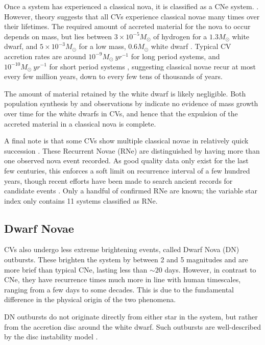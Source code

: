 Once a system has experienced a classical nova, it is classified as a CNe system. \citep{warner1995}. However, theory suggests that all CVs experience classical novae many times over their lifetimes. The required amount of accreted material for the nova to occur depends on mass, but lies between $3\times10^{-5} M_\odot$ of hydrogen for a $1.3 M_\odot$ white dwarf, and $5\times10^{-3} M_\odot$ for a low mass, $0.6 M_\odot$ white dwarf \citep{hellier2001}. Typical CV accretion rates are around $10^{-9} M_\odot\ yr^{-1}$ for long period systems, and $10^{-10} M_\odot\ yr^{-1}$ for short period systems \citep{hellier2001, Pala2021}, suggesting classical novae recur at most every few million years, down to every few tens of thousands of years.

The amount of material retained by the white dwarf is likely negligible. Both population synthesis by \citep{Wijnen2015} and observations by \citep{McAllister2017} indicate no evidence of mass growth over time for the white dwarfs in CVs, and hence that the expulsion of the accreted material in a classical nova is complete.

A final note is that some CVs show multiple classical novae in relatively quick succession \citep{schaeffer2010}. These Recurrent Novae (RNe) are distinguished by having more than one observed nova event recorded. As good quality data only exist for the last few centuries, this enforces a soft limit on recurrence interval of a few hundred years, though recent efforts have been made to search ancient records for candidate events \citep{hoffmann2022}. Only a handful of confirmed RNe are known; the variable star index \citep{Watson2006} only contains 11 systems classified as RNe.

\subsection{Dwarf Novae}
\label{sect:introduction:dwarf novae}

CVs also undergo less extreme brightening events, called Dwarf Nova (DN) outbursts. These brighten the system by between 2 and 5 magnitudes \citep{warner1995} and are more brief than typical CNe, lasting less than $\sim 20$ days. However, in contrast to CNe, they have recurrence times much more in line with human timescales, ranging from a few days to some decades. This is due to the fundamental difference in the physical origin of the two phenomena.

DN outbursts do not originate directly from either star in the system, but rather from the accretion disc around the white dwarf. Such outbursts are well-described by the disc instability model \citep{cannizzo1993, dubus2018}.

